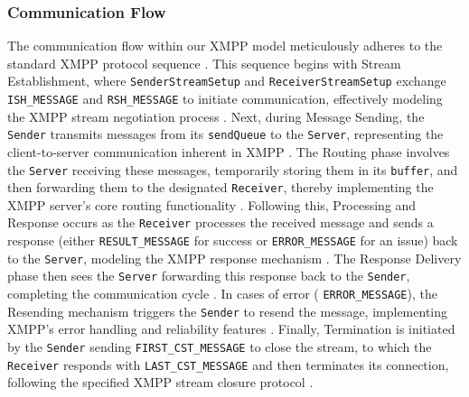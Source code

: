 \subsubsection{Communication Flow}
The communication flow within our XMPP model meticulously adheres to the standard XMPP protocol sequence \cite{rfc6120,meijer2005jabber}. This sequence begins with Stream Establishment, where \texttt{SenderStreamSetup} and \texttt{ReceiverStreamSetup} exchange \texttt{ISH\_MESSAGE} and \texttt{RSH\_MESSAGE} to initiate communication, effectively modeling the XMPP stream negotiation process \cite{rfc6120}. Next, during Message Sending, the \texttt{Sender} transmits messages from its \texttt{sendQueue} to the \texttt{Server}, representing the client-to-server communication inherent in XMPP \cite{meijer2005jabber}. The Routing phase involves the \texttt{Server} receiving these messages, temporarily storing them in its \texttt{buffer}, and then forwarding them to the designated \texttt{Receiver}, thereby implementing the XMPP server's core routing functionality \cite{smith2009xmpp}. Following this, Processing and Response occurs as the \texttt{Receiver} processes the received message and sends a response (either \texttt{RESULT\_MESSAGE} for success or \texttt{ERROR\_MESSAGE} for an issue) back to the \texttt{Server}, modeling the XMPP response mechanism \cite{rfc6120}. The Response Delivery phase then sees the \texttt{Server} forwarding this response back to the \texttt{Sender}, completing the communication cycle \cite{meijer2005jabber}. In cases of error ( \texttt{ERROR\_MESSAGE}), the Resending mechanism triggers the \texttt{Sender} to resend the message, implementing XMPP's error handling and reliability features \cite{waher2015learning}. Finally, Termination is initiated by the \texttt{Sender} sending \texttt{FIRST\_CST\_MESSAGE} to close the stream, to which the \texttt{Receiver} responds with \texttt{LAST\_CST\_MESSAGE} and then terminates its connection, following the specified XMPP stream closure protocol \cite{rfc6120}.

